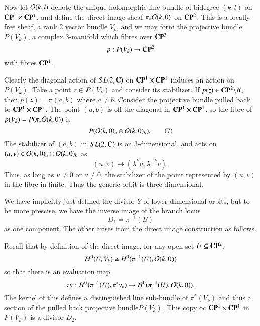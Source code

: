 Now let $\mathcal{O}(k, l)$ denote the unique holomorphic line bundle of bidegree $(k,l)$ on $\mathbf{C}\mathbf{P}^{1}\times \mathbf{C}\mathbf{P}^{1}$, and define the direct image sheaf $\pi_{*}\mathcal{O}(k, 0)$ on $\mathbf{C}\mathbf{P}^{2}$. This is a locally free sheaf, a rank 2 vector bundle $V_{k}$, and we may form the  projective bundle $P(V_{k})$, a complex 3-manifold which fibres over $\mathbf{C}\mathbf{P}^{3}$
$$
p : P(V_{k})\rightarrow \mathbf{C}\mathbf{P}^{2}
$$
with fibres $\mathbf{C}\mathbf{P}^{1}$.

Clearly the diagonal action of $SL(2,\mathbf{C})$ on $\mathbf{C}\mathbf{P}^{1} \times \mathbf{C}\mathbf{P}^{1}$ induces an action on $P(V_{k})$. Take a point $z \in P(V_{k})$ and consider its stabilizer. If $p(z) \in \mathbf{C}\mathbf{P}^{2}\backslash B$, then $p(z) = \pi(a, b)$ where $a\neq b$. Consider the projective bundle pulled back to $\mathbf{C}\mathbf{P}^{1} \times \mathbf{C}\mathbf{P}^{1}$. The point $(a, b)$ is off the diagonal in $\mathbf{C}\mathbf{P}^{1}\times \mathbf{C}\mathbf{P}^{1}$. so the fibre of $p(V_{k}) = P(\pi_{*}\mathcal{O}(k, 0))$ is
\begin{equation*}\label{chap7-eq-7}
P(\mathcal{O}(k,0)_{a}\oplus \mathcal{O}(k,0)_{b}).\tag{7}
\end{equation*}
The stabilizer of $(a, b)$ in $SL(2, \mathbf{C})$ is on 3-dimensional, and acts on\break $(u, v) \in \mathcal{O} (k, 0)_{a}\oplus \mathcal{O}(k,0)_{b}$ as
$$
(u, v)\mapsto(\lambda^{k}u, \lambda^{-k}v).
$$
Thus, as long as $u \neq 0$ or $v\neq 0$, the stabilizer of the point represented by $(u, v)$ in the fibre in finite. Thus the generic orbit is three-dimensional.

We have implicitly just defined the divisor $Y$ of lower-dimensional orbits, but to be more prescise, we have the inverse image of the branch locus
$$
D_{1}= \pi^{-1}(B)
$$
as one component. The other arises from the direct image construction as follows.

Recall that by definition of the direct image, for any open set $U\subseteq \mathbf{C}\mathbf{P}^{2}$,
$$
H^{0}(U, V_{k}) \cong H^{0}(\pi^{-1}(U), \mathcal{O}(k, 0))
$$
so that there is an evaluation map
$$
\operatorname{ev}: H^{0}(\pi^{-1}(U), \pi^{*}v_{k})\rightarrow H^{0}(\pi^{-1}(U), \mathcal{O}(k,0)).
$$
The kernel of this defines a distinguished line sub-bundle of $\pi^{*}(V_{k})$ and thus a section of the pulled back projective bundle$P(V_{k})$. This copy oc $\mathbf{C}\mathbf{P}^{1} \times \mathbf{C}\mathbf{P}^{1}$ in $P(V_{k})$ is a divisor $D_{2}$.

